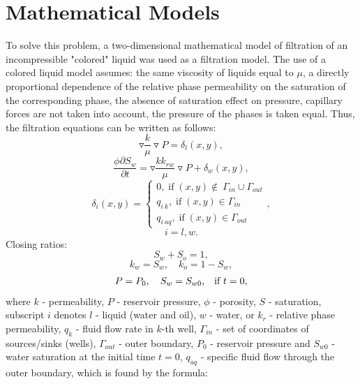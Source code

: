 \documentclass[
11pt,%
tightenlines,%
twoside,%
onecolumn,%
nofloats,%
nobibnotes,%
nofootinbib,%
superscriptaddress,%
noshowpacs,%
centertags]%
{revtex4}
\begin{document}
\section{Mathematical Models}
To solve this problem, a two-dimensional mathematical model of filtration of an incompressible "colored" liquid \cite{bas} was used as a filtration model. The use of a colored liquid model assumes: the same viscosity of liquids equal to $\mu$, a directly proportional dependence of the relative phase permeability on the saturation of the corresponding phase, the absence of saturation effect on pressure, capillary forces are not taken into account, the pressure of the phases is taken equal. Thus, the filtration equations can be written as follows:
\begin{equation} \label{fil}
\triangledown\frac{k}{\mu}\triangledown P = \delta_{l}(x,y),
\end{equation}
\begin{equation} \label{fil2}
\frac{\phi\partial S_w}{\partial t} = \triangledown\frac{kk_{rw}}{\mu}\triangledown P +\delta_w(x,y),
\end{equation}
\begin{equation} \label{bc}
\delta_{i}(x,y)  = \left\{\begin{array}{crl}
0, \;\mbox{if}\;(x,y) \notin\ \Gamma_{in}\cup\Gamma_{out}\\
q_{i\:k}, \;\mbox{if}\;(x,y) \in \Gamma_{in}\\
q_{i\:aq}, \;\mbox{if}\;(x,y) \in \Gamma_{out}
\end{array}\right.,
\end{equation}
\begin{equation*}
	i = l,w.
\end{equation*}
Closing ratios:
\begin{equation*}
	S_w + S_o = 1,
\end{equation*}
\begin{equation} \label{kr}
	k_w = S_w, \quad k_o = 1 - S_w,
\end{equation}
\begin{equation*}
	P = P_0,\quad S_w = S_{w0}\mbox{,\quad \mbox{if} $t=0$},
\end{equation*}
where $k$ - permeability, $P$ - reservoir pressure, $\phi$ - porosity, $S$ - saturation, subscript $i$ denotes $l$ - liquid (water and oil), $w$ - water, or $k_{r}$ - relative phase permeability, $q_k$ - fluid flow rate in $k$-th well, $\Gamma_{in}$ - set of coordinates of sources/sinks (wells), $\Gamma_{out}$ - outer boundary, $P_0$ - reservoir pressure and $S_{w0}$ - water saturation at the initial time $t=0$, $q_{aq}$ - specific fluid flow through the outer boundary, which is found by the formula:
\end{document}
